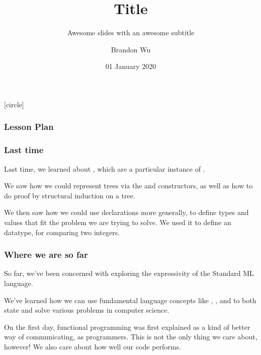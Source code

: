 \documentclass[aspectratio=169]{beamer}
\title{Title} %
\subtitle{Awesome slides with an awesome subtitle} %
\date{01 January 2020} %
\author{Brandon Wu} %
\newif\ifcolorlambda
\begin{document}
\ifweb
    \renewcommand{\pause}{}
\fi

[circle]

{
\begin{frame}[plain]
    \colorlambdatrue
    \titlepage
\end{frame}
}

\begin{frame}[fragile]
  \frametitle{Lesson Plan}

  \tableofcontents
\end{frame}

\begin{frame}[fragile]
  \frametitle{Last time}

  Last time, we learned about , which are a particular instance of
  .

  \vspace{\fill}

  We saw how we could represent trees via the  and  
  constructors, as well as how to do proof by structural induction on a tree. 

  \vspace{\fill}

  We then saw how we could use  declarations more generally, to
  define types and values that fit the problem we are trying to solve. We used
  it to define an  datatype, for comparing two integers.
\end{frame}


\begin{frame}[fragile]
  \frametitle{Where we are so far}

  So far, we've been concerned with exploring the expressivity of the Standard ML
  language.

  \vspace{\fill}

  We've learned how we can use fundamental language concepts like 
  , , and 
  to both state and solve various problems in computer science.

  \vspace{\fill}

  On the first day, functional programming was first explained as a kind of 
  better way of communicating, as programmers. This is not the only thing we
  care about, however! We also care about how well our code performs.
\end{frame}
\end{document}
